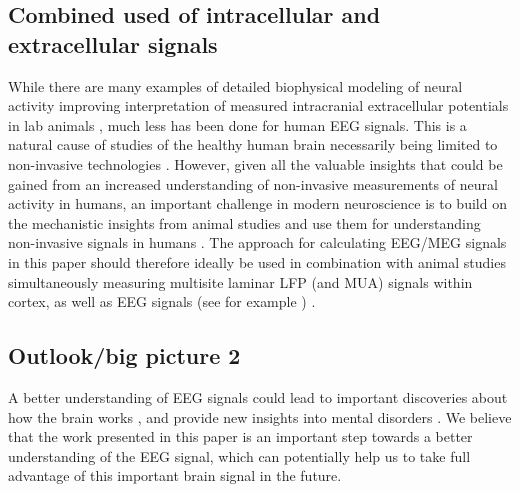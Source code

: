 \documentclass[preprint,10pt,authoryear]{elsarticle}
\newcommand{\gex}[1]{{\color{Orange}#1}}
\begin{document}
\gex{\subsection{Combined used of intracellular and extracellular signals}}
While there are many examples of detailed biophysical modeling of neural activity improving interpretation of measured intracranial extracellular potentials in lab animals \citep{Einevoll2007, Blomquist2009, McColgan2017, Luo2018, Chatzikalymniou2018, Telenczuk2019}, much less has been done for human EEG signals. This is a natural cause of studies of the healthy human brain necessarily being limited to non-invasive technologies \citep{SILVA2013, Uhlirova2016, COHEN2017}.
However, given all the valuable insights that could be gained from an increased understanding of non-invasive measurements of neural activity in humans, an important challenge in modern neuroscience is to build on the mechanistic insights from animal studies and use them for understanding non-invasive signals in humans \citep{SILVA2013, Uhlirova2016, COHEN2017, EINEVOLL2019, MAKI2019}.
The approach for calculating EEG/MEG signals in this paper should therefore ideally be used in combination with animal studies simultaneously measuring multisite laminar LFP (and MUA) signals within cortex, as well as EEG signals (see for example \cite{BRUYNS2017}) \citep{COHEN2017}.

\gex{\subsection{Outlook/big picture 2}}
A better understanding of EEG signals could lead to important discoveries about how the brain works \citep{SILVA2013, Uhlirova2016, Pesaran2018, Ilmoniemi2019}, and provide new insights into mental disorders \citep{MAKI2019, Sahin2019}.
We believe that the work presented in this paper is an important step towards a better understanding of the EEG signal, which can potentially help us to take full advantage of this important brain signal in the future.

\end{document}
